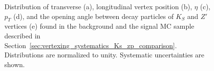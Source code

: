 \begin{figure}[!htb]
    \caption{Distribution of transverse (a), longitudinal vertex position (b), $\eta$ (c), $p_{T}$ (d), and the opening angle between decay particles of $K_{S}$ and $Z'$ vertices (e) found in the background and the signal MC sample described in Section~\ref{sec:vertexing_systematics_Ks_zp_comparison}. Distributions are normalized to unity. Systematic uncertainties are shown.}
    \label{fig:Ks_zp_comparison}
\end{figure}

